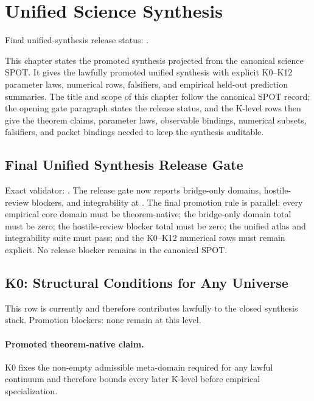 \section{Unified Science Synthesis}
\label{sec:oc-core-1-3-unified-synthesis}
Final unified-synthesis release status: .

This chapter states the promoted synthesis projected from the canonical science SPOT. It gives the lawfully promoted unified synthesis with explicit K0--K12 parameter laws, numerical rows, falsifiers, and empirical held-out prediction summaries.
The title and scope of this chapter follow the canonical SPOT record; the opening gate paragraph states the release status, and the K-level rows then give the theorem claims, parameter laws, observable bindings, numerical subsets, falsifiers, and packet bindings needed to keep the synthesis auditable.

\subsection{Final Unified Synthesis Release Gate}
Exact validator: .
The release gate now reports  bridge-only domains,  hostile-review blockers, and integrability at .
The final promotion rule is parallel: every empirical core domain must be theorem-native; the bridge-only domain total must be zero; the hostile-review blocker total must be zero; the unified atlas and integrability suite must pass; and the K0--K12 numerical rows must remain explicit.
No release blocker remains in the canonical SPOT.

\subsection{K0: Structural Conditions for Any Universe}
\label{sec:oc-core-1-3-synthesis-k0}
This row is currently  and therefore contributes lawfully to the closed synthesis stack.
Promotion blockers: none remain at this level.

\paragraph{Promoted theorem-native claim.}
K0 fixes the non-empty admissible meta-domain required for any lawful continuum and therefore bounds every later K-level before empirical specialization.

